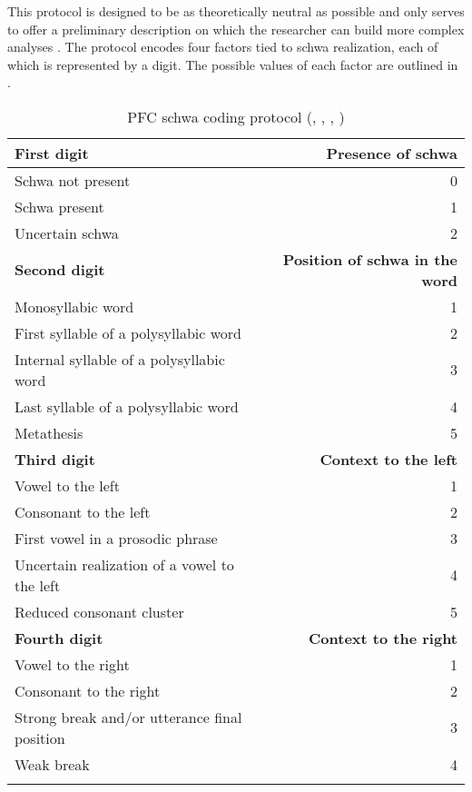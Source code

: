 \documentclass[output=paper,colorlinks,citecolor=brown,
]{langscibook}
\begin{document}
This protocol is designed to be as theoretically neutral as possible and only serves to offer a preliminary description on which the researcher can build more complex analyses \citep[61]{pfc4}. The protocol encodes four factors tied to schwa realization, each of which is represented by a digit. The possible values of each factor are outlined in .
\begin{table}
\caption{PFC schwa coding protocol (\citeauthor{pfc}, \citeyear{pfc}, \citeyear{pfc2}, \citeyear{pfc3})}
\label{tab:griffiths:proto}
\begin{tabular}{lr}
  \lsptoprule
\textbf{First digit} & \textbf{Presence of schwa} \\ \midrule
Schwa not present & 0 \\
Schwa present & 1 \\
Uncertain schwa & 2 \\ \midrule
\textbf{Second digit} & \textbf{Position of schwa in the word} \\ \midrule
Monosyllabic word & 1 \\
First syllable of a polysyllabic word & 2 \\
Internal syllable of a polysyllabic word & 3 \\
Last syllable of a polysyllabic word & 4 \\
Metathesis & 5 \\ \midrule
\textbf{Third digit} & \textbf{Context to the left} \\ \midrule
Vowel to the left & 1 \\
Consonant to the left & 2 \\
First vowel in a prosodic phrase & 3 \\
Uncertain realization of a vowel to the left & 4 \\
Reduced consonant cluster & 5 \\ \midrule
\textbf{Fourth digit} & \textbf{Context to the right} \\ \midrule
Vowel to the right & 1 \\
Consonant to the right & 2 \\
Strong break and/or utterance final position & 3 \\
Weak break & 4 \\  \lspbottomrule
\end{tabular}
\end{table}
\end{document}
